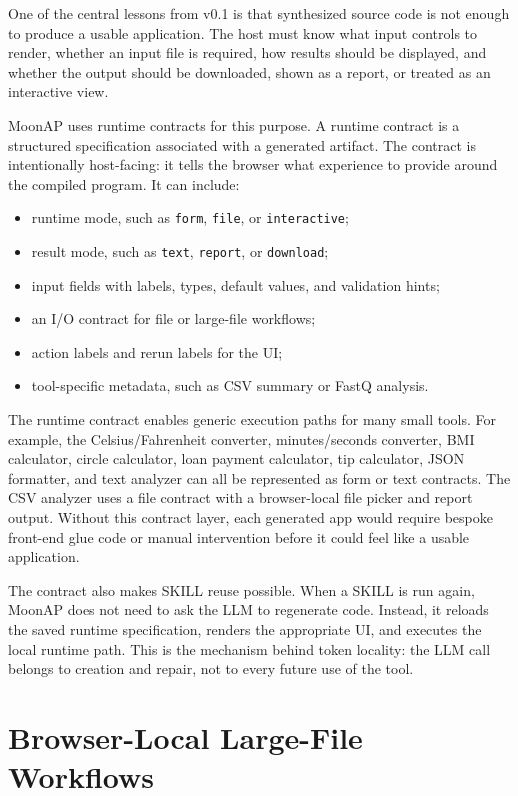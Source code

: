 \documentclass[11pt]{article}
\newcommand{\moonap}{MoonAP}
\newcommand{\skill}{SKILL}
\begin{document}
One of the central lessons from v0.1 is that synthesized source code is not enough to produce a usable application. The host must know what input controls to render, whether an input file is required, how results should be displayed, and whether the output should be downloaded, shown as a report, or treated as an interactive view.

\moonap{} uses runtime contracts for this purpose. A runtime contract is a structured specification associated with a generated artifact. The contract is intentionally host-facing: it tells the browser what experience to provide around the compiled program. It can include:

\begin{itemize}[leftmargin=*]
  \item runtime mode, such as \texttt{form}, \texttt{file}, or \texttt{interactive};
  \item result mode, such as \texttt{text}, \texttt{report}, or \texttt{download};
  \item input fields with labels, types, default values, and validation hints;
  \item an I/O contract for file or large-file workflows;
  \item action labels and rerun labels for the UI;
  \item tool-specific metadata, such as CSV summary or FastQ analysis.
\end{itemize}

The runtime contract enables generic execution paths for many small tools. For example, the Celsius/Fahrenheit converter, minutes/seconds converter, BMI calculator, circle calculator, loan payment calculator, tip calculator, JSON formatter, and text analyzer can all be represented as form or text contracts. The CSV analyzer uses a file contract with a browser-local file picker and report output. Without this contract layer, each generated app would require bespoke front-end glue code or manual intervention before it could feel like a usable application.

The contract also makes \skill{} reuse possible. When a \skill{} is run again, \moonap{} does not need to ask the LLM to regenerate code. Instead, it reloads the saved runtime specification, renders the appropriate UI, and executes the local runtime path. This is the mechanism behind token locality: the LLM call belongs to creation and repair, not to every future use of the tool.

\section{Browser-Local Large-File Workflows}
\end{document}
